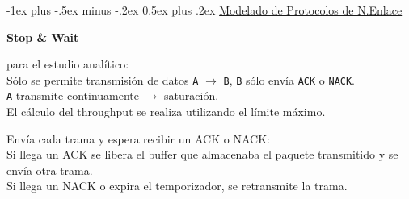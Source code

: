 \documentclass[9pt,landscape]{extarticle}
\makeatletter
\renewcommand{\section}{\@startsection{section}{1}{0mm}%
                                {-1ex plus -.5ex minus -.2ex}%
                                {0.5ex plus .2ex}%
                                {\normalfont\large\bfseries}}
\makeatother
\begin{document}
\begin{multicols}{3}
\section{\underline{Modelado de Protocolos de N.Enlace}}


\qquad \textbf{Stop \& Wait}

 para el estudio analítico:\\
	\quad Sólo se permite transmisión de datos \texttt{A} $\rightarrow$ \texttt{B}, \texttt{B} sólo envía \texttt{ACK} o \texttt{NACK}.\\
	\quad \texttt{A} transmite continuamente $\rightarrow$ saturación.\\
	\quad El cálculo del throughput se realiza utilizando el límite máximo.
	


Envía cada trama y espera recibir un ACK o NACK:\\
	\quad Si llega un ACK se libera el buffer que almacenaba el paquete transmitido y se envía otra trama.\\
	\quad Si llega un NACK o expira el temporizador, se retransmite la trama.\\

\begin{center}
\end{center}

\begin{center}
\begin{tabular}{|l|l|l|}


\end{tabular}
\end{center}
\end{multicols}
\end{document}
